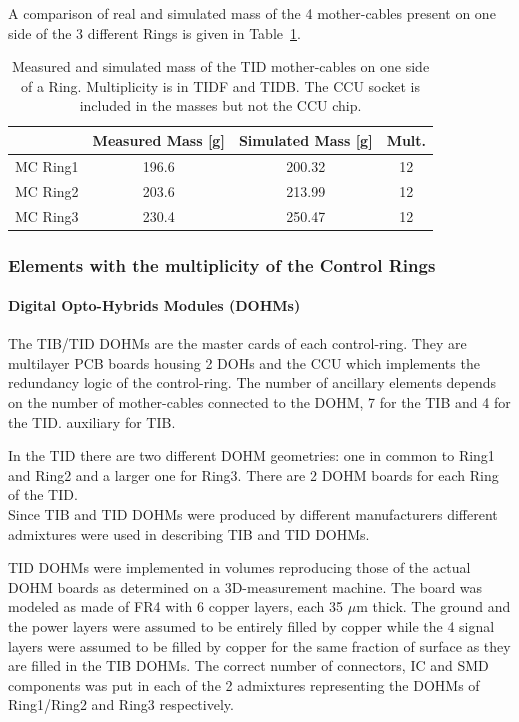 \documentclass{cmspaper}
\begin{document}
A comparison of real and simulated mass of the 4 mother-cables present
on one side of the 3 different Rings is given in Table~\ref{tab:tid_mc}.
\begin{table}[h!]
  \caption{Measured and simulated mass of the TID mother-cables on one
  side of a Ring.  Multiplicity is in TIDF and TIDB. The CCU socket is
  included in the masses but not the CCU chip.}
  \label{tab:tid_mc}
  \begin{center}
    \begin{tabular}{lccc}
      & Measured Mass [g] & Simulated Mass [g] & Mult. \\
      \hline
      MC Ring1 & 196.6 & 200.32 & 12 \\
      MC Ring2 & 203.6 & 213.99 & 12 \\
      MC Ring3 & 230.4 & 250.47 & 12 \\
      \hline
    \end{tabular}
  \end{center}
\end{table}


\subsubsection{Elements with the multiplicity of the Control Rings}
\paragraph{Digital Opto-Hybrids Modules (DOHMs)}
The TIB/TID DOHMs are the master cards of each control-ring. They are
multilayer PCB boards housing 2 DOHs and the CCU which implements the
redundancy logic of the control-ring.
The number of ancillary elements depends on the number of
mother-cables connected to the DOHM, 7 for the TIB  and 4 for
the TID. \fixme auxiliary for TIB.

In the TID there are two different DOHM geometries: one in common to Ring1 and
Ring2 and a larger one for Ring3.
There are 2 DOHM boards for each Ring of the TID.\\
Since TIB and TID DOHMs were produced by different manufacturers
different admixtures were used in describing TIB and TID DOHMs.

TID DOHMs were implemented in volumes reproducing those of the actual
DOHM boards as determined on a 3D-measurement machine.
The board was modeled as made of FR4 with 6 copper layers, each 35
$\mu$m thick. The ground and the power layers were assumed to be entirely filled by
copper while the 4 signal layers were assumed to be filled by copper
for the same fraction of surface as they are filled in the TIB DOHMs. 
The correct number of connectors, IC and SMD components was put in
each of the 2 admixtures representing the DOHMs of Ring1/Ring2 and Ring3 respectively.
\end{document}
